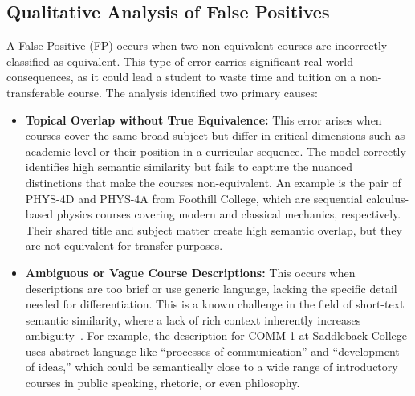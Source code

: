 \subsection{Qualitative Analysis of False Positives}\label{ch:4.6.2}
A False Positive (FP) occurs when two non-equivalent courses are incorrectly classified as equivalent. This type of error carries significant real-world consequences, as it could lead a student to waste time and tuition on a non-transferable course. The analysis identified two primary causes:
\begin{itemize}
    \item \textbf{Topical Overlap without True Equivalence:} This error arises when courses cover the same broad subject but differ in critical dimensions such as academic level or their position in a curricular sequence. The model correctly identifies high semantic similarity but fails to capture the nuanced distinctions that make the courses non-equivalent. An example is the pair of PHYS-4D and PHYS-4A from Foothill College, which are sequential calculus-based physics courses covering modern and classical mechanics, respectively. Their shared title and subject matter create high semantic overlap, but they are not equivalent for transfer purposes.
    \item \textbf{Ambiguous or Vague Course Descriptions:} This occurs when descriptions are too brief or use generic language, lacking the specific detail needed for differentiation. This is a known challenge in the field of short-text semantic similarity, where a lack of rich context inherently increases ambiguity~\cite{app13063911}. For example, the description for COMM-1 at Saddleback College uses abstract language like ``processes of communication'' and ``development of ideas,'' which could be semantically close to a wide range of introductory courses in public speaking, rhetoric, or even philosophy.
\end{itemize}

